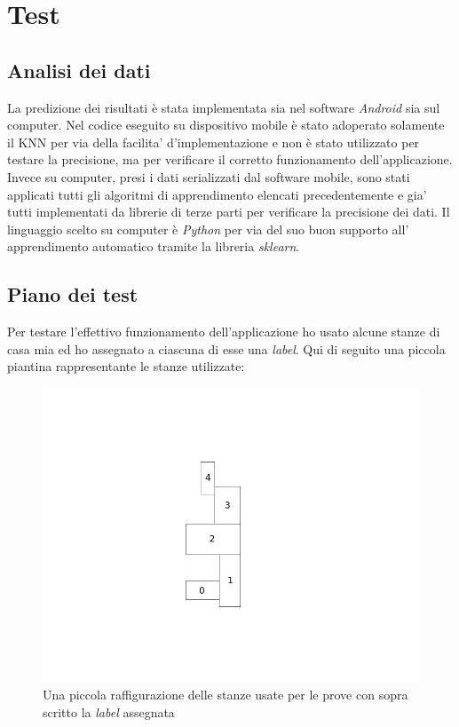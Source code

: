 \chapter{Test}

\section{Analisi dei dati}
La predizione dei risultati \`e stata implementata sia nel software \textit{Android} sia sul computer. Nel codice eseguito su dispositivo mobile \`e stato adoperato solamente il KNN per via della facilita' d'implementazione e non \`e stato  utilizzato per testare la precisione, ma per verificare il corretto funzionamento dell'applicazione. Invece su computer, presi i dati serializzati dal software mobile, sono stati applicati tutti gli algoritmi di apprendimento elencati precedentemente e gia' tutti implementati da librerie di terze parti per verificare la precisione dei dati. Il linguaggio scelto su computer \`e \textit{Python} per via del suo buon supporto all' apprendimento automatico tramite la libreria \textit{sklearn}.



\section{Piano dei test}
Per testare l'effettivo funzionamento dell'applicazione ho usato alcune stanze di casa mia ed ho assegnato a ciascuna di esse una \textit{label}. Qui di seguito una piccola piantina rappresentante le stanze utilizzate:

\begin{figure}[H]
\centering
\includegraphics[width=0.7\linewidth]{img/test_pianta_casa}
\caption{Una piccola raffigurazione delle stanze usate per le prove con sopra scritto la \textit{label} assegnata}
\label{fig:test_pianta_casa}
\end{figure}

